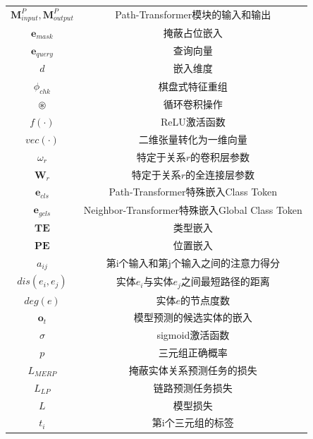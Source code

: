 \begin{longtable}[htbp]{cc}
  $\mathbf{M}_{input}^{P},\mathbf{M}_{output}^{P}$ & Path-Transformer模块的输入和输出\\
  $\boldsymbol{e}_{mask}$ & 掩蔽占位嵌入\\
  $\boldsymbol{e}_{query}$ & 查询向量\\
  $d$ & 嵌入维度\\
  $\phi_{chk}$ & 棋盘式特征重组\\
  $\circledast$ & 循环卷积操作\\
  $f(\cdot )$ & ReLU激活函数\\
  $vec(\cdot)$ & 二维张量转化为一维向量\\
  $\omega_r$ & 特定于关系$r$的卷积层参数\\
  $\mathbf{W}_r$ &特定于关系$r$的全连接层参数\\
  $\boldsymbol{e}_{cls}$ & Path-Transformer特殊嵌入Class Token\\
  $\boldsymbol{e}_{gcls}$ & Neighbor-Transformer特殊嵌入Global Class Token\\
  $\mathbf{TE}$ & 类型嵌入\\
  $\mathbf{PE}$ & 位置嵌入\\
  $a_{ij}$ & 第i个输入和第j个输入之间的注意力得分\\
  $dis(e_i,e_j)$ & 实体$e_i$与实体$e_j$之间最短路径的距离\\
  $deg(e)$ & 实体$e$的节点度数\\
  $\boldsymbol{o}_t$ & 模型预测的候选实体的嵌入\\
  $\sigma $ & sigmoid激活函数\\
  $p$ & 三元组正确概率\\
  $L_{MERP}$ & 掩蔽实体关系预测任务的损失\\
  $L_{LP}$ & 链路预测任务损失\\
  $L$ & 模型损失\\
  $t_i$ & 第i个三元组的标签\\

\end{longtable}

